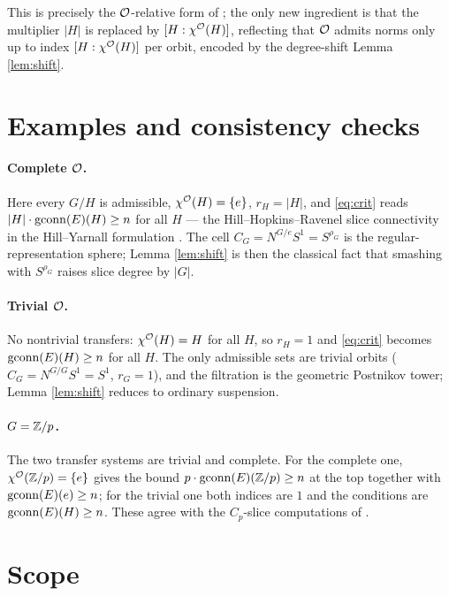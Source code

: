 This is precisely the $\mathcal{O}$-relative form of \cite[Thm.~2.5]{HY18}; the only
new ingredient is that the multiplier $|H|$ is replaced by $[H:\chi^{\mathcal{O}}(H)]$,
reflecting that $\mathcal{O}$ admits norms only up to index $[H:\chi^{\mathcal{O}}(H)]$ per orbit,
encoded by the degree-shift Lemma \ref{lem:shift}.

\section*{Examples and consistency checks}

\paragraph{Complete $\mathcal{O}$.} Here every $G/H$ is admissible, $\chi^{\mathcal{O}}(H)=\{e\}$,
$r_H=|H|$, and \eqref{eq:crit} reads $|H|\cdot\operatorname{gconn}(E)(H)\ge n$ for all
$H$ --- the Hill--Hopkins--Ravenel slice connectivity in the Hill--Yarnall
formulation \cite{HY18, HHR16}. The cell $C_G=N^{G/e}S^1=S^{\rho_G}$ is the
regular-representation sphere; Lemma \ref{lem:shift} is then the classical fact
that smashing with $S^{\rho_G}$ raises slice degree by $|G|$.

\paragraph{Trivial $\mathcal{O}$.} No nontrivial transfers: $\chi^{\mathcal{O}}(H)=H$ for all $H$,
so $r_H=1$ and \eqref{eq:crit} becomes $\operatorname{gconn}(E)(H)\ge n$ for all
$H$. The only admissible sets are trivial orbits ($C_G=N^{G/G}S^1=S^1$,
$r_G=1$), and the filtration is the geometric Postnikov tower; Lemma
\ref{lem:shift} reduces to ordinary suspension.

\paragraph{$G=\mathbb{Z}/p$.} The two transfer systems are trivial and complete. For the
complete one, $\chi^{\mathcal{O}}(\mathbb{Z}/p)=\{e\}$ gives the bound $p\cdot\operatorname{gconn}(E)(\mathbb{Z}/p)\ge n$
at the top together with $\operatorname{gconn}(E)(e)\ge n$; for the trivial one both indices
are $1$ and the conditions are $\operatorname{gconn}(E)(H)\ge n$. These agree with the
$C_p$-slice computations of \cite{HY18}.

\section*{Scope}


